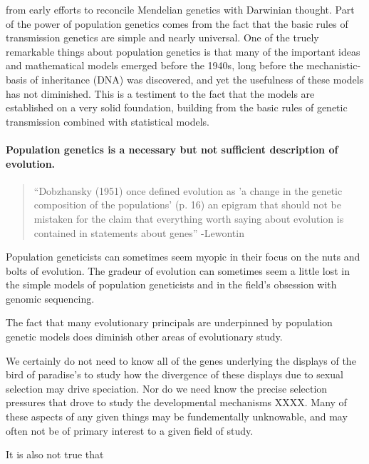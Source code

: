  from early efforts to
reconcile Mendelian genetics with Darwinian thought.
Part of the power of
population genetics comes from the fact that the basic rules of
transmission genetics are simple and nearly universal.  One of the truely remarkable things about population genetics is that
many of the important ideas and mathematical models emerged before the
1940s, long before the
mechanistic-basis of inheritance (DNA) was discovered, and yet the
usefulness of these models has not diminished. This is a testiment to
the fact that the models are established on a very solid foundation,
building from the basic rules of genetic transmission combined with
statistical models.   

\paragraph{Population genetics is a necessary but not sufficient description of evolution.}
\begin{quote}
``Dobzhansky (1951) once defined evolution as 'a change in the genetic
composition of the populations' (p. 16) an epigram that should not be
mistaken for the claim that everything worth saying about evolution is
contained in statements about genes'' -Lewontin \cite{lewontin01} 
\end{quote}


Population geneticists can sometimes seem
myopic in their focus on the nuts and bolts of evolution. The gradeur
of evolution can sometimes seem a little lost in the simple models of
population geneticists and in the field's obsession with genomic
sequencing. 

The fact that many evolutionary principals are underpinned by
population genetic models does diminish other
areas of evolutionary study. 

We certainly do not need to know all of the genes underlying the 
displays of the bird of paradise's to study how the divergence of
these displays due to sexual selection may drive speciation. 
Nor do we need know the precise selection pressures that drove
to study the developmental mechanisms XXXX. 
Many of these aspects of any given things may be fundementally
unknowable, and may often not be of primary interest to a given field
of study. 

It is also not true that 
\newpage